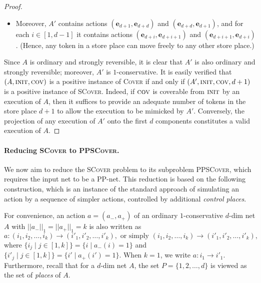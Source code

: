 \documentclass[11pt,a4paper]{amsart}
\newcommand{\Cover}{\textsc{Cover}\xspace}
\newcommand{\SCover}{\textsc{SCover}\xspace}
\newcommand{\PPSCover}{\textsc{PPSCover}\xspace}
\newcommand{\pptrans}[3]{#1:(#2) \rightarrow (#3)}
\newcommand{\pptransone}[3]{#1: #2 \rightarrow #3}
\newcommand{\normone}[1]{||#1||_1}
\newcommand{\pinit}{\textsc{init}}
\newcommand{\pcov}{\textsc{cov}}
\let\origtextsc\textsc
\renewcommand{\textsc}[1]{\textnormal{\origtextsc{#1}}}
\theoremstyle{plain}
\theoremstyle{definition}
\theoremstyle{defC}
\theoremstyle{thmC}
\begin{document}
\begin{proof}
\begin{itemize}
	\item
Moreover, $A'$ contains actions $(\mathbf{e}_{d+1},\mathbf{e}_{d+d})$ and 
		$(\mathbf{e}_{d+d},\mathbf{e}_{d+1})$, and   
		for each $i\in[1,d-1]$ it contains actions
		$(\mathbf{e}_{d+i},\mathbf{e}_{d+i+1})$ and 
		$(\mathbf{e}_{d+i+1},\mathbf{e}_{d+i})$. 
		(Hence, any token in a store place can move freely to any other store place.)
\end{itemize}
Since $A$ is ordinary and strongly reversible, it is
 clear that $A'$ is also ordinary and strongly reversible; moreover,
	$A'$ is $1$-conservative. 
	It is easily verified that $(A,\pinit,\pcov)$ is a positive instance of \Cover if and
	only if  $(A',\pinit,\pcov,d+1)$ is a positive instance of
	\SCover. 
Indeed, if $\pcov$ is coverable from $\pinit$ by an execution of $A$, then
it suffices to provide an adequate number of tokens in the store place
	$d+1$ to allow the execution to be mimicked by $A'$.
	Conversely, the projection of any execution of $A'$ onto the
	first $d$ components constitutes a valid execution of $A$.
\end{proof}	



\paragraph{Reducing \SCover to \PPSCover.}
We now aim to reduce the \SCover problem to its subproblem \PPSCover,
which requires the input net to be a PP-net.  
This reduction is based on the following construction, which is an instance of
the standard approach of simulating an action by a sequence of simpler
actions, controlled by additional \emph{control places}. 

For convenience, an action $a=(a_-,a_+)$ of an ordinary
$1$-conservative $d$-dim net $A$ with
$\normone{a_-}=\normone{a_+}=k$ is also written as 
\begin{equation*}
\pptrans{a}{i_1,i_2,\dots,i_k}{i'_1,i'_2,\dots,i'_k},
	\text{ or simply }(i_1,i_2,\dots,i_k)\rightarrow(i'_1,i'_2,\dots,i'_k),
\end{equation*}
where $\{i_j\mid j\in[1,k]\}=\{i\mid a_-(i)=1\}$ and
 $\{i'_j\mid j\in[1,k]\}=\{i'\mid a_+(i')=1\}$.
When $k=1$, we write $\pptransone{a}{i_1}{i'_1}$.
Furthermore, recall that for a $d$-dim net $A$, the set
$P=\{1,2,\dots,d\}$ is viewed as the set of \emph{places} of $A$.   
\end{document}
